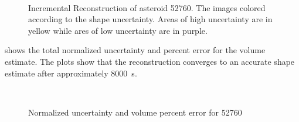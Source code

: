 \begin{figure}[htbp]
    ~
    \caption[Asteroid 52760 Shape Reconstruction with Uncertainty]{Incremental Reconstruction of asteroid 52760. The images colored according to the shape uncertainty. Areas of high uncertainty are in yellow while ares of low uncertainty are in purple.~\label{fig:52760_weights_reconstruction}}
\end{figure}
 shows the total normalized uncertainty and percent error for the volume estimate. 
The plots show that the reconstruction  converges to an accurate shape estimate after approximately \SI{8000}{\second}.
\begin{figure}[htbp]
    \centering
    ~
    \caption{Normalized uncertainty and volume percent error for 52760\label{fig:52760_metrics}}
\end{figure}

